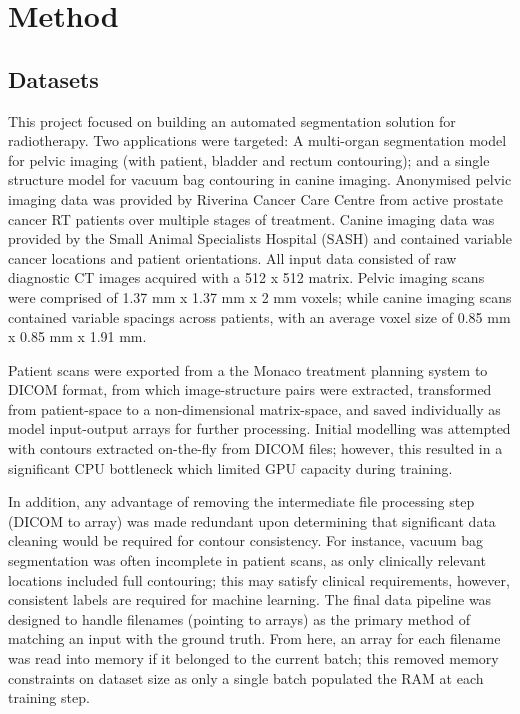\chapter{Method}
\label{ch:method}

\section{Datasets}
\label{ch:method-dataset}
This project focused on building an automated segmentation solution for radiotherapy. Two applications were targeted: A multi-organ segmentation model for pelvic imaging (with patient, bladder and rectum contouring); and a single structure model for vacuum bag contouring in canine imaging. Anonymised pelvic imaging data was provided by Riverina Cancer Care Centre from active prostate cancer RT patients over multiple stages of treatment. Canine imaging data was provided by the Small Animal Specialists Hospital (SASH) and contained variable cancer locations and patient orientations. All input data consisted of raw diagnostic CT images acquired with a 512 x 512 matrix. Pelvic imaging scans were comprised of 1.37 mm x 1.37 mm x 2 mm voxels; while canine imaging scans contained variable spacings across patients, with an average voxel size of 0.85 mm x 0.85 mm x 1.91 mm.

Patient scans were exported from a the Monaco treatment planning system
to DICOM format, from which image-structure pairs were extracted, transformed from patient-space to a non-dimensional matrix-space, and saved individually as model input-output arrays for further processing. Initial modelling was attempted with contours extracted on-the-fly from DICOM files; however, this resulted in a significant CPU bottleneck which limited GPU capacity during training.

In addition, any advantage of removing the intermediate file processing step (DICOM to array) was made redundant upon determining that significant data cleaning would be required for contour consistency.
For instance, vacuum bag segmentation was often incomplete in patient scans, as only clinically relevant locations included full contouring; this may satisfy clinical requirements, however, consistent labels
are required for machine learning. The final data pipeline was designed to handle filenames (pointing to arrays) as the primary method of matching an input with the ground truth. From here, an array for each filename was read into memory if it belonged to the current batch; this removed memory constraints on dataset size as only a single batch populated the RAM at each training step.

